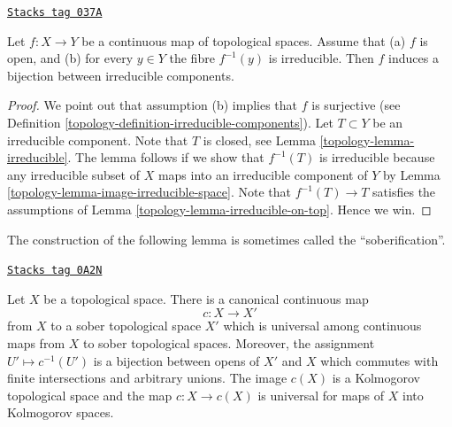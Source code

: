 \begin{lemma}
\label{topology-lemma-irreducible-fibres-irreducible-components}
\href{https://stacks.math.columbia.edu/tag/037A}{\texttt{Stacks tag 037A}}

Let $f : X \to Y$ be a continuous map of topological spaces.
Assume that (a) $f$ is open, and
(b) for every $y \in Y$ the fibre $f^{-1}(y)$ is irreducible.
Then $f$ induces a bijection between irreducible components.
\end{lemma}

\begin{proof}

We point out that assumption (b) implies that $f$ is surjective (see
Definition \ref{topology-definition-irreducible-components}).
Let $T \subset Y$ be an irreducible component.
Note that $T$ is closed, see Lemma \ref{topology-lemma-irreducible}.
The lemma follows if we show that $f^{-1}(T)$ is irreducible
because any irreducible subset of $X$ maps into an irreducible component
of $Y$ by Lemma \ref{topology-lemma-image-irreducible-space}.
Note that $f^{-1}(T) \to T$ satisfies the assumptions
of Lemma \ref{topology-lemma-irreducible-on-top}. Hence we win.
\end{proof}

The construction of the following lemma is sometimes called
the ``soberification''.

\begin{lemma}
\label{topology-lemma-make-sober}
\href{https://stacks.math.columbia.edu/tag/0A2N}{\texttt{Stacks tag 0A2N}}

\begin{reference}
\cite[Page 68 ff]{EGA1-second}
\end{reference}
Let $X$ be a topological space. There is a canonical continuous map
$$
c : X \longrightarrow X'
$$
from $X$ to a sober topological space $X'$ which is universal
among continuous maps from $X$ to sober topological spaces.
Moreover, the assignment $U' \mapsto c^{-1}(U')$ is a bijection
between opens of $X'$ and $X$ which commutes with finite intersections
and arbitrary unions.
The image $c(X)$ is a Kolmogorov topological space and the
map $c : X \to c(X)$ is universal for maps of $X$ into Kolmogorov spaces.
\end{lemma}

